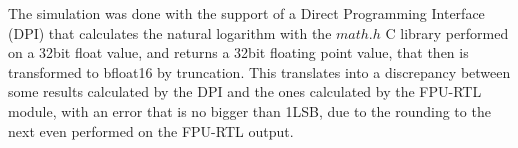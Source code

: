 \documentclass{report}
\begin{document}
The simulation was done with the support of a Direct Programming Interface (DPI) that calculates the natural logarithm with the $math.h$ C library performed on a 32bit float value, and returns a 32bit floating point value, that then is transformed to bfloat16 by truncation. This translates into a discrepancy between some results calculated by the DPI and the ones calculated by the FPU-RTL module, with an error that is no bigger than 1LSB, due to the rounding to the next even performed on the FPU-RTL output.
\end{document}
